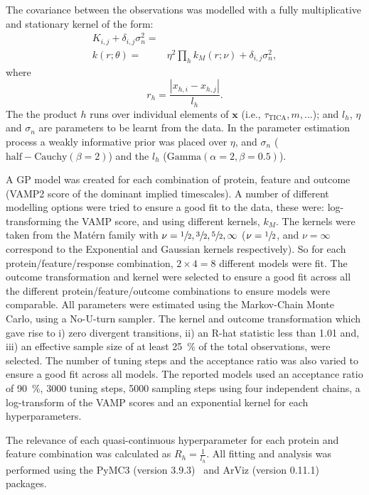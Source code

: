 \documentclass[journal=jacsat,manuscript=article]{achemso}
\begin{document}
 The covariance between the observations was modelled with a fully multiplicative and stationary kernel of the form: 
 \begin{align}\label{eqn:kernel_form}
     K_{i, j} + \delta_{i, j}\sigma_{n}^{2} = & \\
     k\left(r; \theta\right) = &
     \eta^{2}\prod_h k_{M}\left(r; \nu\right) + \delta_{i, j}\sigma_{n}^{2},
 \end{align}
 where 
  \begin{equation}
     r_{h} = \frac{|x_{h, i}-x_{h, j}|}{l_h}.
 \end{equation}
 The the product $h$ runs over individual elements of $\mathbf{x}$ (i.e., $\tau_{\mathrm{TICA}}, m, \ldots$); and $l_h$, $\eta$ and $\sigma_n$ are parameters to  be learnt from the data. In the parameter estimation process a weakly informative prior was placed over $\eta$, and $\sigma_{n}$ ($\mathrm{half-Cauchy}(\beta=2)$) and the $l_h$  ($\mathrm{Gamma}(\alpha=2, \beta=0.5)$). 
 
 A GP model was created for each combination of protein, feature and outcome (VAMP2 score of the dominant implied timescales). A number of different modelling options were tried to ensure a good fit to the data, these were: log-transforming the VAMP score, and using different kernels, $k_{M}$. The kernels were taken from the Mat\'ern family with $\nu=\sfrac{1}{2}, \sfrac{3}{2}, \sfrac{5}{2}, \infty$ ($\nu=\sfrac{1}{2}$, and $\nu=\infty$ correspond to the Exponential and Gaussian kernels respectively). So for each protein/feature/response combination, $2\times 4 =8$ different models were fit. The outcome transformation and kernel were selected to ensure a good fit across all the different protein/feature/outcome combinations to ensure models were comparable. All parameters were estimated using the Markov-Chain Monte Carlo, using a No-U-turn sampler. The kernel and outcome transformation which gave rise to i) zero divergent transitions, ii) an R-hat statistic less than 1.01 and,  iii) an effective sample size of at least \SI{25}{\percent} of the total observations,  were selected. The number of tuning steps and the acceptance ratio was also varied to ensure a good fit across all models. The reported models used an acceptance ratio of \SI{90}{\percent}, \num{3000} tuning steps, \num{5000} sampling steps using four independent chains, a log-transform of the VAMP scores and an exponential kernel for each hyperparameters. 
 
 The relevance of each quasi-continuous hyperparameter for each protein and feature combination was calculated as $R_{h} = \frac{1}{l_{h}}$. 
 All fitting and analysis was performed using the PyMC3 (version 3.9.3)~\cite{salvatierProbabilisticProgrammingPython2016} and ArViz (version 0.11.1)~\cite{arviz_2019} packages. 
 
\end{document}
